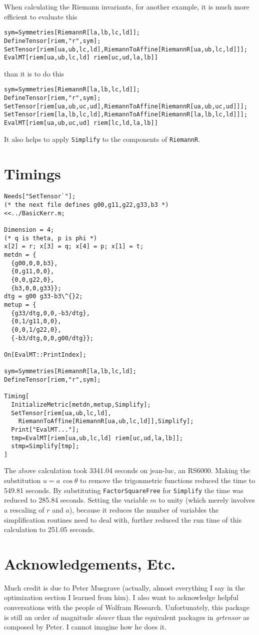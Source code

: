 When calculating the Riemann invariants, for another example, it is much
more efficient to evaluate this
\begin{verbatim}
sym=Symmetries[RiemannR[la,lb,lc,ld]];
DefineTensor[riem,"r",sym];
SetTensor[riem[ua,ub,lc,ld],RiemannToAffine[RiemannR[ua,ub,lc,ld]]];
EvalMT[riem[ua,ub,lc,ld] riem[uc,ud,la,lb]]
\end{verbatim}
than it is to do this
\begin{verbatim}
sym=Symmetries[RiemannR[la,lb,lc,ld]];
DefineTensor[riem,"r",sym];
SetTensor[riem[ua,ub,uc,ud],RiemannToAffine[RiemannR[ua,ub,uc,ud]]];
SetTensor[riem[la,lb,lc,ld],RiemannToAffine[RiemannR[la,lb,lc,ld]]];
EvalMT[riem[ua,ub,uc,ud] riem[lc,ld,la,lb]]
\end{verbatim}

It also helps to apply {\tt Simplify} to the components
of {\tt RiemannR}.

\section{Timings}

\begin{verbatim}
Needs["SetTensor`"];
(* the next file defines g00,g11,g22,g33,b3 *)
<<../BasicKerr.m;

Dimension = 4;
(* q is theta, p is phi *)
x[2] = r; x[3] = q; x[4] = p; x[1] = t;
metdn = {
  {g00,0,0,b3},
  {0,g11,0,0},
  {0,0,g22,0},
  {b3,0,0,g33}};
dtg = g00 g33-b3\^{}2;
metup = {
  {g33/dtg,0,0,-b3/dtg},
  {0,1/g11,0,0},
  {0,0,1/g22,0},
  {-b3/dtg,0,0,g00/dtg}};

On[EvalMT::PrintIndex];

sym=Symmetries[RiemannR[la,lb,lc,ld];
DefineTensor[riem,"r",sym];

Timing[
  InitializeMetric[metdn,metup,Simplify];
  SetTensor[riem[ua,ub,lc,ld],
    RiemannToAffine[RiemannR[ua,ub,lc,ld]],Simplify];
  Print["EvalMT..."];
  tmp=EvalMT[riem[ua,ub,lc,ld] riem[uc,ud,la,lb]];
  stmp=Simplify[tmp];
]
\end{verbatim}
The above calculation took 3341.04 seconds on jean-luc,
an RS6000.  Making the substitution $u = a\,\cos\theta$ to
remove the trigonmetric functions reduced the time to
549.81 seconds.  By substituting {\tt FactorSquareFree} for
{\tt Simplify} the time was reduced to 285.84 seconds.  Setting
the variable $m$ to unity (which merely involves a rescaling of
$r$ and $a$), because it reduces the number of variables the
simplification routines need to deal with, further reduced the
run time of this calculation to 251.05 seconds.


\section{Acknowledgements, Etc.}

Much credit is due to Peter Musgrave (actually, almost everything I say
in the optimization section I learned from him).
I also want to acknowledge
helpful conversations with the people of Wolfram Research.
Unfortunately, this package is still an order of magnitude {\em slower}
than the equivalent packages in {\it grtensor} as composed by Peter.
I cannot imagine how he does it.


